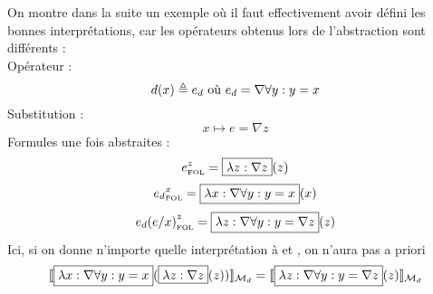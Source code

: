 \documentclass[12pt]{article}
\newcommand{\FOL}{\ensuremath{\textup{\tiny{}FOL}}}
\newcommand{\M}{\ensuremath{\mathcal{M}}}
\newcommand{\bpar}[1]{\marginpar{\color{myblue}\footnotesize\raggedright#1}}
\begin{document}
\begin{itemize}
  On montre dans la suite un exemple où il faut effectivement avoir défini les bonnes interprétations, car les opérateurs obtenus lors de l'abstraction sont différents : \\
  Opérateur :
  \[ d(x) \triangleq e_d \textup{ où } e_d = \nabla \forall y : y = x \]
  Substitution :
  \bpar{cad, $x \mapsto \nabla z$ ?}
  \[ x \mapsto e = \nabla z \]
  Formules une fois abstraites :
  \[ e_\FOL^z = \framebox{$\lambda z : \nabla z$}(z) \]
  \[ {e_d}_\FOL^x = \framebox{$\lambda x : \nabla \forall y : y = x$}(x) \]
  \[ {e_d(e/x)}_\FOL^z = \framebox{$\lambda z : \nabla \forall y : y = \nabla z$}(z) \]
  Ici, si on donne n'importe quelle interprétation à  et , on n'aura pas a priori
  \[
    \llbracket \framebox{$\lambda x : \nabla \forall y : y = x$}(\framebox{$\lambda z : \nabla z$}(z)) \rrbracket_{\M_d}
    =
    \llbracket \framebox{$\lambda z : \nabla \forall y : y = \nabla z$}(z) \rrbracket_{\M_d}
  \]
\end{itemize}
\end{document}
